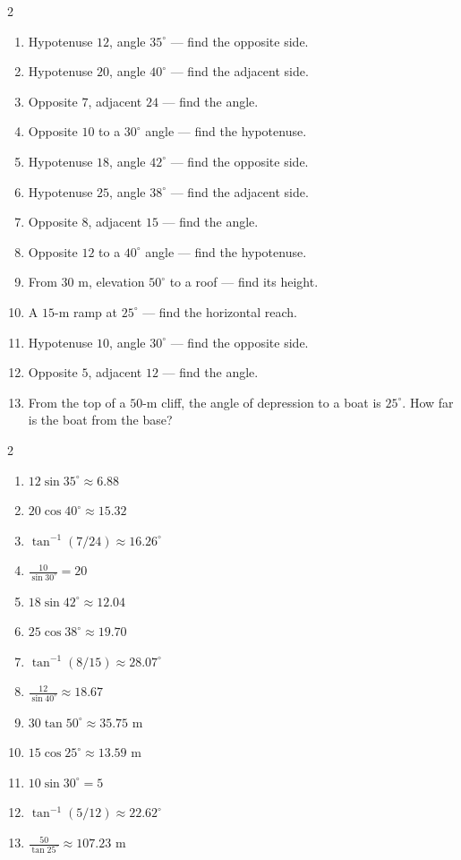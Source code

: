 \documentclass[11pt]{article}
\begin{document}
\begin{recapbox}
\begin{multicols}{2}
\small
\begin{enumerate}[leftmargin=*,itemsep=3pt]
  \item Hypotenuse $12$, angle $35^\circ$ — find the opposite side.
  \item Hypotenuse $20$, angle $40^\circ$ — find the adjacent side.
  \item Opposite $7$, adjacent $24$ — find the angle.
  \item Opposite $10$ to a $30^\circ$ angle — find the hypotenuse.
  \item Hypotenuse $18$, angle $42^\circ$ — find the opposite side.
  \item Hypotenuse $25$, angle $38^\circ$ — find the adjacent side.
  \item Opposite $8$, adjacent $15$ — find the angle.
  \item Opposite $12$ to a $40^\circ$ angle — find the hypotenuse.
  \item From $30$ m, elevation $50^\circ$ to a roof — find its height.
  \item A $15$-m ramp at $25^\circ$ — find the horizontal reach.
  \item Hypotenuse $10$, angle $30^\circ$ — find the opposite side.
  \item Opposite $5$, adjacent $12$ — find the angle.
  \item From the top of a $50$-m cliff, the angle of depression to a boat is $25^\circ$. How far is the boat from the base?
\end{enumerate}
\end{multicols}
\end{recapbox}

\begin{keybox}
\begin{multicols}{2}
\small
\begin{enumerate}[leftmargin=*,itemsep=3pt]
  \item $12\sin35^\circ\approx6.88$
  \item $20\cos40^\circ\approx15.32$
  \item $\tan^{-1}(7/24)\approx16.26^\circ$
  \item $\tfrac{10}{\sin30^\circ}=20$
  \item $18\sin42^\circ\approx12.04$
  \item $25\cos38^\circ\approx19.70$
  \item $\tan^{-1}(8/15)\approx28.07^\circ$
  \item $\tfrac{12}{\sin40^\circ}\approx18.67$
  \item $30\tan50^\circ\approx35.75$ m
  \item $15\cos25^\circ\approx13.59$ m
  \item $10\sin30^\circ=5$
  \item $\tan^{-1}(5/12)\approx22.62^\circ$
  \item $\tfrac{50}{\tan25^\circ}\approx107.23$ m
\end{enumerate}
\end{multicols}
\end{keybox}
\end{document}

